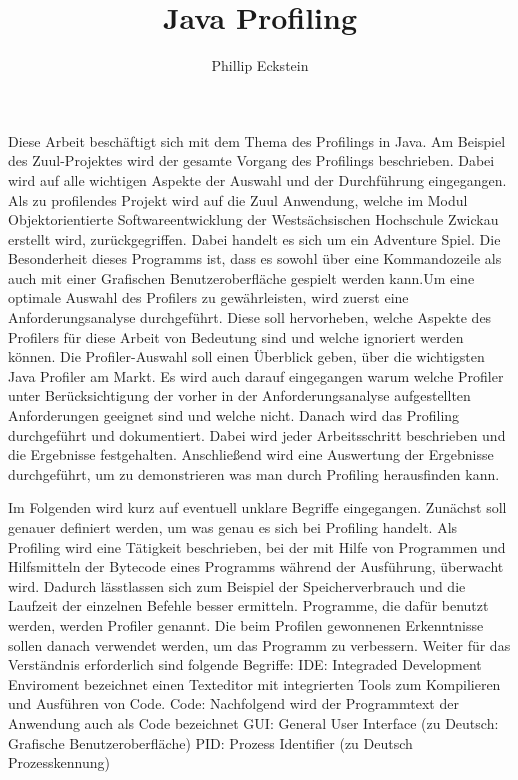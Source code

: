 \documentclass[a4paper,12pt]{scrreprt}
\author{Phillip Eckstein}
\title{Java Profiling}
\begin{document}
    
\maketitle
\tableofcontents

\pagebreak

Diese Arbeit beschäftigt sich mit dem Thema des Profilings in Java. Am Beispiel des Zuul-Projektes wird der gesamte Vorgang des Profilings beschrieben. Dabei wird auf alle wichtigen Aspekte der Auswahl und der Durchführung eingegangen. Als zu profilendes Projekt wird auf die Zuul Anwendung, welche im Modul Objektorientierte Softwareentwicklung der Westsächsischen Hochschule Zwickau erstellt wird, zurückgegriffen. Dabei handelt es sich um ein Adventure Spiel. Die Besonderheit dieses Programms ist, dass es sowohl über eine Kommandozeile als auch mit einer Grafischen Benutzeroberfläche gespielt werden kann.Um eine optimale Auswahl des Profilers zu gewährleisten, wird zuerst eine Anforderungsanalyse durchgeführt. Diese soll hervorheben, welche Aspekte des Profilers für diese Arbeit von Bedeutung sind und welche ignoriert werden können. Die Profiler-Auswahl soll einen Überblick geben, über die wichtigsten Java Profiler am Markt. Es wird auch darauf eingegangen warum welche Profiler unter Berücksichtigung der vorher in der Anforderungsanalyse aufgestellten Anforderungen geeignet sind und welche nicht. Danach wird das Profiling durchgeführt und dokumentiert. Dabei wird jeder Arbeitsschritt beschrieben und die Ergebnisse festgehalten. Anschließend wird eine Auswertung der Ergebnisse durchgeführt, um zu demonstrieren was man durch Profiling herausfinden kann.

\newpage
\listoffigures
\listoftables
\newpage


Im Folgenden wird kurz auf eventuell unklare Begriffe eingegangen. Zunächst soll genauer definiert werden, um was genau es sich bei Profiling handelt. Als Profiling wird eine Tätigkeit beschrieben, bei der mit Hilfe von Programmen und Hilfsmitteln der Bytecode eines Programms während der Ausführung, überwacht wird. Dadurch lässtlassen sich zum Beispiel der Speicherverbrauch und die Laufzeit der einzelnen Befehle besser ermitteln. Programme, die dafür benutzt werden, werden Profiler genannt. Die beim Profilen gewonnenen Erkenntnisse sollen danach verwendet werden, um das Programm zu verbessern. Weiter für das Verständnis erforderlich sind folgende Begriffe:
IDE: Integraded Development Enviroment bezeichnet einen Texteditor mit integrierten Tools zum Kompilieren und Ausführen von Code.
Code: Nachfolgend wird der Programmtext der Anwendung auch als Code bezeichnet
GUI:  General User Interface (zu Deutsch: Grafische Benutzeroberfläche)
PID: Prozess Identifier (zu Deutsch Prozesskennung) ~\cite{WEBSITE:6}
\end{document}
